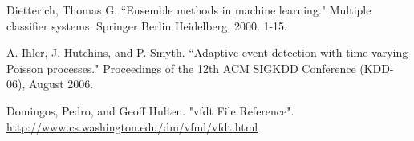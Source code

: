 \documentclass[conference]{IEEEtran}
\begin{document}
\begin{thebibliography}{9}
			Dietterich, Thomas G. ``Ensemble methods in machine learning." Multiple classifier systems. Springer Berlin Heidelberg, 2000. 1-15.
			
			A. Ihler, J. Hutchins, and P. Smyth. ``Adaptive event detection with time-varying Poisson processes." Proceedings of the 12th ACM SIGKDD Conference (KDD-06), August 2006.
			
           	Domingos, Pedro, and Geoff Hulten. "vfdt File Reference". \url{http://www.cs.washington.edu/dm/vfml/vfdt.html}
		
		
		
			
		
			
		
		\end{thebibliography}
		
		
		
		
		
	
\end{document}
